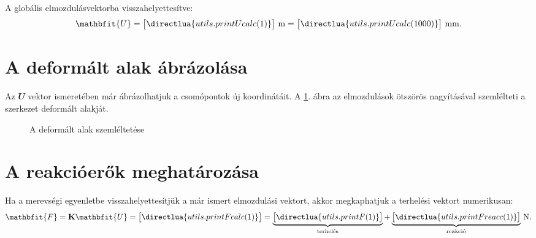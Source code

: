 \documentclass[a4paper, 12pt]{scrartcl}
\newcommand{\rvec}[1]{\mathbfit{#1}}
\newcommand{\rmat}[1]{\mathbf{#1}}
\begin{document}
A globális elmozdulásvektorba visszahelyettesítve:
\begin{equation}
  {\rvec U} = \begin{bmatrix}
    \directlua{utils.printUcalc(1)}
  \end{bmatrix} \, \mathrm{m}
  =
  \sisetup{
    exponent-mode = fixed,
    round-precision = 3
  }
  \begin{bmatrix}
    \directlua{utils.printUcalc(1000)}
  \end{bmatrix} \, \mathrm{mm}.
  \label{eq:Ucalc}
\end{equation}




\section{A deformált alak ábrázolása} %
\label{sec:A deformált alak ábrázolása}

Az $\rvec U$ vektor ismeretében már ábrázolhatjuk a csomópontok új koordinátáit.
A \ref{fig:deformed}. ábra az elmozdulások ötszörös nagyításával szemlélteti a
szerkezet deformált alakját.

\begin{figure}[H]
  \centering
  
  \caption{A deformált alak szemléltetése}
  \label{fig:deformed}
\end{figure}




\section{A reakcióerők meghatározása} %
\label{sec:A reakcióerők meghatározása}

Ha a merevségi egyenletbe visszahelyettesítjük a már ismert elmozdulási vektort,
akkor megkaphatjuk a terhelési vektort numerikusan:
\begin{equation}
  \rvec F = \rmat K \rvec U =
  \sisetup{
    exponent-mode = fixed,
    round-precision = 3
  }
  \begin{bmatrix}
    \directlua{utils.printFcalc(1)}
  \end{bmatrix}
  =
  \underbrace{\begin{bmatrix}
      \directlua{utils.printF(1)}
    \end{bmatrix}}_\text{terhelés}
  +
  \underbrace{\begin{bmatrix}
      \directlua{utils.printFreacc(1)}
    \end{bmatrix}}_\text{reakció}
  \, \mathrm{N}.
  \label{eq:Fcalc}
\end{equation}
\end{document}
